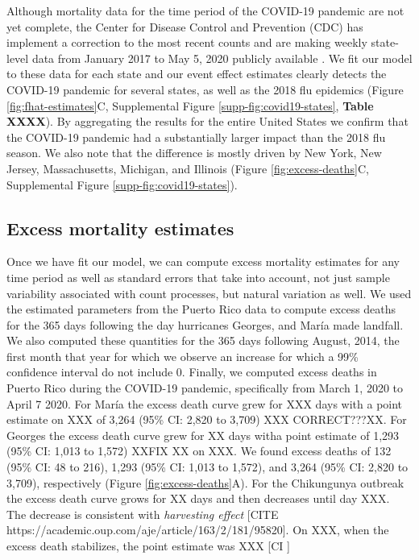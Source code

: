 \documentclass[11pt]{article}
\begin{document}
Although mortality data for the time period of the COVID-19 pandemic are not yet complete, the Center for Disease Control and Prevention (CDC) has implement a correction to the most recent counts and are making weekly state-level data from January 2017 to May 5, 2020 publicly available \cite{cdc2020covid19}. We fit our model to these data for each state and our event effect estimates clearly detects the COVID-19 pandemic for several states, as well as the 2018 flu epidemics (Figure \ref{fig:fhat-estimates}C, Supplemental Figure \ref{supp-fig:covid19-states}, \textbf{Table XXXX}). By aggregating the results for the entire United States we confirm that the COVID-19 pandemic had a substantially larger impact than the 2018 flu season. We also note that the difference is mostly driven by New York, New Jersey, Massachusetts, Michigan, and Illinois (Figure \ref{fig:excess-deaths}C, Supplemental Figure \ref{supp-fig:covid19-states}).

\subsection{Excess mortality estimates}
\label{subsec:excess-mortality}
Once we have fit our model, we can compute excess mortality estimates for any time period as well as standard errors that take into account, not just sample variability associated with count processes, but natural variation as well. We used the estimated parameters from the Puerto Rico data to compute excess deaths for the 365 days following the day hurricanes Georges, and Mar\'ia made landfall. We also computed these quantities for the 365 days following August, 2014, the first month that year for which we observe an increase for which a 99\% confidence interval do not include 0. Finally, we computed excess deaths in Puerto Rico during the COVID-19 pandemic, specifically from March 1, 2020 to April 7 2020. For María the excess death curve grew for XXX days with a point estimate on XXX of 3,264 (95\% CI: 2,820 to 3,709) XXX CORRECT???XX. For Georges the excess death curve grew for XX days witha point estimate of 1,293 (95\% CI: 1,013 to 1,572) XXFIX XX on XXX. We found excess deaths of 132 (95\% CI: 48 to 216), 1,293 (95\% CI: 1,013 to 1,572), and 3,264 (95\% CI: 2,820 to 3,709), respectively (Figure \ref{fig:excess-deaths}A). For the Chikungunya outbreak the excess death curve grows for XX days and then decreases until day XXX. The decrease is consistent with \emph{harvesting effect} [CITE https://academic.oup.com/aje/article/163/2/181/95820]. On XXX, when the excess death stabilizes, the point estimate was XXX [CI ]
\end{document}
